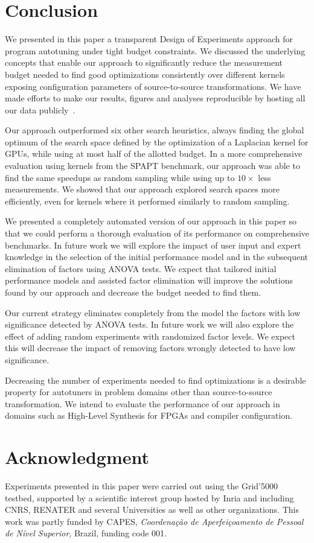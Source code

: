 \documentclass[conference]{IEEEtran}
\begin{document}
\vspace{-40pt}

\section{Conclusion}
\label{sec:org239c0fa}
We presented in this paper a transparent Design of Experiments approach for
program autotuning under tight budget constraints. We discussed the underlying
concepts that enable our approach to significantly reduce the measurement budget
needed to find good optimizations consistently over different kernels exposing
configuration parameters of source-to-source transformations. We have made efforts
to make our results, figures and analyses reproducible by hosting all our data
publicly~\cite{bruel2018ipdps19}.

Our approach outperformed six other search heuristics, always finding the global
optimum of the search space defined by the optimization of a Laplacian kernel
for GPUs, while using at most half of the allotted budget. In a more
comprehensive evaluation using kernels from the SPAPT benchmark, our approach
was able to find the same speedups as random sampling while using up to
\(10\times\) less measurements. We showed that our approach explored search spaces
more efficiently, even for kernels where it performed similarly to random
sampling.

We presented a completely automated version of our approach in this paper so
that we could perform a thorough evaluation of its performance on comprehensive
benchmarks. In future work we will explore the impact of user input and expert
knowledge in the selection of the initial performance model and in the
subsequent elimination of factors using ANOVA tests. We expect that tailored
initial performance models and assisted factor elimination will improve the
solutions found by our approach and decrease the budget needed to find them.

Our current strategy eliminates completely from the model the factors with low
significance detected by ANOVA tests. In future work we will also explore the
effect of adding random experiments with randomized factor levels. We expect
this will decrease the impact of removing factors wrongly detected to have low
significance.

Decreasing the number of experiments needed to find optimizations is a desirable
property for autotuners in problem domains other than source-to-source
transformation. We intend to evaluate the performance of our approach in domains
such as High-Level Synthesis for FPGAs and compiler configuration.
\section*{Acknowledgment}
\label{sec:org6e4f71f}
Experiments presented in this paper were carried out using the Grid'5000
testbed, supported by a scientific interest group hosted by Inria and including
CNRS, RENATER and several Universities as well as other organizations.
This work was partly funded by CAPES, \emph{Coordenação de Aperfeiçoamento de Pessoal
de Nível Superior}, Brazil, funding code 001.



\end{document}
